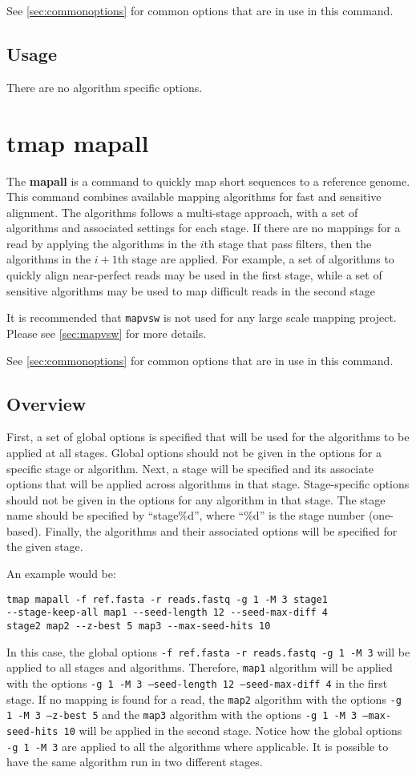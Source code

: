 \documentclass[a4paper,12pt]{book}
\newcommand{\TT}[1]{{\tt #1}} %
\newcommand{\BF}[1]{{\bf #1}} %
\begin{document}
See \autoref{sec:commonoptions} for common options that are in use in this command.

\subsection{Usage}
There are no algorithm specific options.

\section{tmap mapall}
\label{sec:mapall}
The \BF{mapall} is a command to quickly map short sequences to a reference genome.
This command combines available mapping algorithms for fast and sensitive alignment.
The algorithms follows a multi-stage approach, with a set of algorithms and associated settings for each stage.
If there are no mappings for a read by applying the algorithms in the $i$th stage that pass filters, then the algorithms in the $i+1$th stage are applied. 
For example, a set of algorithms to quickly align near-perfect reads may be used in the first stage, while a set of sensitive algorithms may be used to map difficult reads in the second stage

It is recommended that \TT{mapvsw} is not used for any large scale mapping project.  
Please see \autoref{sec:mapvsw} for more details.

See \autoref{sec:commonoptions} for common options that are in use in this command.

\subsection{Overview}
First, a set of global options is specified that will be used for the algorithms to be applied at all stages.
Global options should not be given in the options for a specific stage or algorithm.
Next, a stage will be specified and its associate options that will be applied across algorithms in that stage.
Stage-specific options should not be given in the options for any algorithm in that stage.
The stage name should be specified by ``stage\%d'', where ``\%d'' is the stage number (one-based).
Finally, the algorithms and their associated options will be specified for the given stage.

An example would be:
\begin{verbatim}
tmap mapall -f ref.fasta -r reads.fastq -g 1 -M 3 stage1 
--stage-keep-all map1 --seed-length 12 --seed-max-diff 4 
stage2 map2 --z-best 5 map3 --max-seed-hits 10
\end{verbatim}
In this case, the global options \TT{-f ref.fasta -r reads.fastq -g 1 -M 3} will be applied to all stages and algorithms. 
Therefore, \TT{map1} algorithm will be applied with the options \TT{-g 1 -M 3 --seed-length 12 --seed-max-diff 4} in the first stage.
If no mapping is found for a read, the \TT{map2} algorithm with the options \TT{-g 1 -M 3 --z-best 5} and the \TT{map3} algorithm with the options \TT{-g 1 -M 3 --max-seed-hits 10} will be applied in the second stage.
Notice how the global options \TT{-g 1 -M 3} are applied to all the algorithms where applicable.
It is possible to have the same algorithm run in two different stages.
\end{document}
